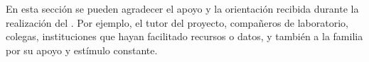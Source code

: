 


En esta sección se pueden agradecer el apoyo y la orientación recibida durante la realización del \tipotrabajoCorto. Por ejemplo, el tutor del proyecto, compañeros de laboratorio, colegas, instituciones que hayan facilitado recursos o datos, y también a la familia por su apoyo y estímulo constante.
